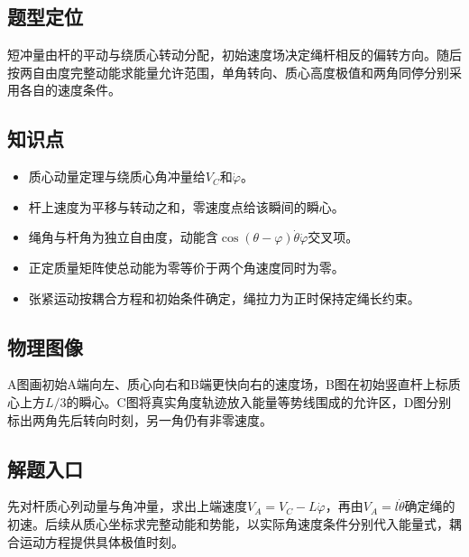 \documentclass[UTF8,fontset=fandol,a4paper,11pt]{ctexart}
\begin{document}
\subsection*{题型定位}

短冲量由杆的平动与绕质心转动分配，初始速度场决定绳杆相反的偏转方向。随后按两自由度完整动能求能量允许范围，单角转向、质心高度极值和两角同停分别采用各自的速度条件。



\subsection*{知识点}

\begin{itemize}
\item 质心动量定理与绕质心角冲量给$V_C$和$\dot\varphi$。
\item 杆上速度为平移与转动之和，零速度点给该瞬间的瞬心。
\item 绳角与杆角为独立自由度，动能含$\cos(\theta-\varphi)\dot\theta\dot\varphi$交叉项。
\item 正定质量矩阵使总动能为零等价于两个角速度同时为零。
\item 张紧运动按耦合方程和初始条件确定，绳拉力为正时保持定绳长约束。\end{itemize}



\subsection*{物理图像}

A图画初始A端向左、质心向右和B端更快向右的速度场，B图在初始竖直杆上标质心上方$L/3$的瞬心。C图将真实角度轨迹放入能量等势线围成的允许区，D图分别标出两角先后转向时刻，另一角仍有非零速度。



\subsection*{解题入口}

先对杆质心列动量与角冲量，求出上端速度$V_A=V_C-L\dot\varphi$，再由$V_A=l\dot\theta$确定绳的初速。后续从质心坐标求完整动能和势能，以实际角速度条件分别代入能量式，耦合运动方程提供具体极值时刻。
\end{document}
